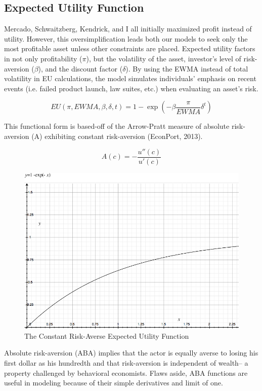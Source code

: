 \documentclass[12pt]{article}
\begin{document}
\subsection{Expected Utility Function}
Mercado, Schwaitzberg, Kendrick, and I all initially maximized profit instead of utility. However, this oversimplification leads both our models to seek only the most profitable asset unless other constraints are placed. Expected utility factors in not only profitability ({\bf{${\pi}$}}), but the volatility of the asset, investor's level of risk-aversion ({\bf ${\beta}$}),  and the discount factor ({\bf {$\delta$}}). By using the EWMA instead of total volatility in EU calculations, the model simulates individuals' emphasis on recent events (i.e. failed product launch, law suites, etc.) when evaluating an asset's risk. 

\begin{equation}
	EU(\pi, EWMA, \beta, \delta, t) = 1 - \exp{(-\beta \frac{\pi}{EWMA} \delta^{t})}
\end{equation}

This functional form is based-off of the Arrow-Pratt measure of absolute risk-aversion (A) exhibiting constant risk-aversion (EconPort, 2013). 

\begin{equation}
	A(c) = -\frac{u''(c)}{u'(c)}
\end{equation}

\begin{figure}[H]
	\begin{center}
		\includegraphics[scale=.4]{Figures/EU_fn.png}
		\caption{The Constant Risk-Averse Expected Utility Function}
	\end{center}
\end{figure}
Absolute risk-aversion (ABA) implies that the actor is equally averse to losing his first dollar as his hundredth and that risk-aversion is independent of wealth-- a property challenged by behavioral economists. Flaws aside, ABA functions are useful in modeling because of their simple derivatives and limit of one.  
\end{document}
